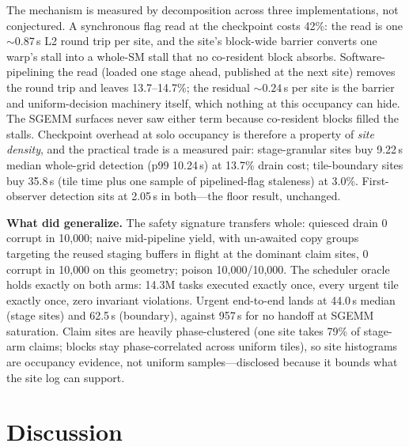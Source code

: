 \documentclass[11pt]{article}
\newcommand{\us}{\,\textmu s\xspace}
\begin{document}
The mechanism is measured by decomposition across three
implementations, not conjectured. A synchronous flag read at the
checkpoint costs 42\%: the read is one ${\sim}0.87$\us{} L2 round
trip per site, and the site's block-wide barrier converts one warp's
stall into a whole-SM stall that no co-resident block absorbs.
Software-pipelining the read (loaded one stage ahead, published at
the next site) removes the round trip and leaves 13.7--14.7\%; the
residual ${\sim}0.24$\us{} per site is the barrier and
uniform-decision machinery itself, which nothing at this occupancy
can hide. The SGEMM surfaces never saw either term because
co-resident blocks filled the stalls. Checkpoint overhead at solo
occupancy is therefore a property of \emph{site density}, and the
practical trade is a measured pair: stage-granular sites buy
9.22\us{} median whole-grid detection (p99 10.24\us) at 13.7\% drain
cost; tile-boundary sites buy 35.8\us{} (tile time plus one sample
of pipelined-flag staleness) at 3.0\%. First-observer detection sits
at 2.05\us{} in both---the floor result, unchanged.

\textbf{What did generalize.} The safety signature transfers whole:
quiesced drain 0 corrupt in 10{,}000; naive mid-pipeline yield, with
un-awaited copy groups targeting the reused staging buffers in
flight at the dominant claim sites, 0 corrupt in 10{,}000 on this
geometry; poison 10{,}000/10{,}000. The scheduler oracle holds
exactly on both arms: 14.3M tasks executed exactly once, every
urgent tile exactly once, zero invariant violations. Urgent
end-to-end lands at 44.0\us{} median (stage sites) and 62.5\us{}
(boundary), against 957\us{} for no handoff at SGEMM saturation.
Claim sites are heavily phase-clustered (one site takes 79\% of
stage-arm claims; blocks stay phase-correlated across uniform
tiles), so site histograms are occupancy evidence, not uniform
samples---disclosed because it bounds what the site log can support.

\section{Discussion}
\label{sec:discussion}
\end{document}
